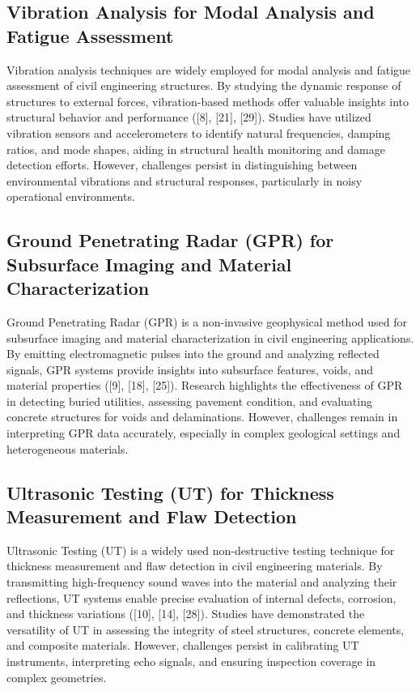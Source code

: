 \documentclass[journal, a4paper]{IEEEtran}
\begin{document}
\subsection{Vibration Analysis for Modal Analysis and Fatigue Assessment}
Vibration analysis techniques are widely employed for modal analysis and fatigue assessment of civil engineering structures.
By studying the dynamic response of structures to external forces, vibration-based methods offer valuable insights into structural
behavior and performance ([8], [21], [29]). Studies have utilized vibration sensors and accelerometers to identify natural
frequencies, damping ratios, and mode shapes, aiding in structural health monitoring and damage detection efforts.
However, challenges persist in distinguishing between environmental vibrations and structural responses,
particularly in noisy operational environments. 

\subsection{Ground Penetrating Radar (GPR) for Subsurface Imaging and Material Characterization}
Ground Penetrating Radar (GPR) is a non-invasive geophysical method used for subsurface imaging and
material characterization in civil engineering applications. By emitting electromagnetic pulses into the
ground and analyzing reflected signals, GPR systems provide insights into subsurface features, voids,
and material properties ([9], [18], [25]). Research highlights the effectiveness of GPR in detecting buried utilities,
assessing pavement condition, and evaluating concrete structures for voids and delaminations. However,
challenges remain in interpreting GPR data accurately, especially in complex geological settings and heterogeneous materials.

\subsection{Ultrasonic Testing (UT) for Thickness Measurement and Flaw Detection}
Ultrasonic Testing (UT) is a widely used non-destructive testing technique for thickness measurement
and flaw detection in civil engineering materials. By transmitting high-frequency sound waves into the
material and analyzing their reflections, UT systems enable precise evaluation of internal defects,
corrosion, and thickness variations ([10], [14], [28]). Studies have demonstrated the versatility of UT
in assessing the integrity of steel structures, concrete elements, and composite materials.
However, challenges persist in calibrating UT instruments, interpreting echo signals, and ensuring inspection coverage
in complex geometries. 
\end{document}

